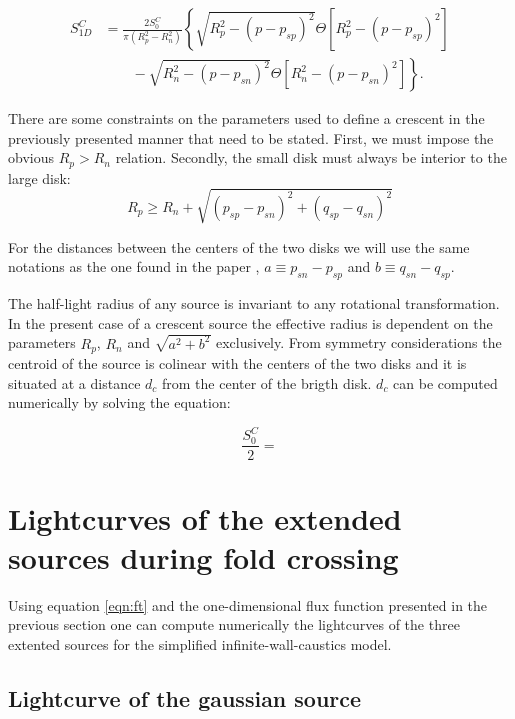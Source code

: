 \begin{align}
 S_{1D}^C &= \frac{2 S_0^C}{\pi \left(R_p^2-R_n^2 \right)} \left\{ \sqrt{R_p^2 - (p-p_{sp})^2}  \Theta \left[ R_p^2 - \left( p-p_{sp} \right)^2 \right] \right.\nonumber\\
 &\qquad \left. {} - \sqrt{R_n^2 - (p-p_{sn})^2 } \Theta \left[ R_n^2 - \left( p-p_{sn} \right)^2 \right] \right\}.
\end{align}


There are some constraints on the parameters used to define a crescent in the previously presented manner that need to be stated. First, we must impose the obvious $R_p > R_n$ relation. Secondly, 
the small disk must always be interior to the large disk:
\begin{equation}
 R_p \ge R_n + \sqrt{\left(p_{sp} - p_{sn} \right)^2 + \left(q_{sp} - q_{sn} \right)^2}
\end{equation}

For the distances between the centers of the two disks we will use the same notations as the one found in the paper \citep{2013MNRAS.434..765K}, $a \equiv p_{sn} - p_{sp}$ and $b \equiv q_{sn} - q_{sp}$.

The half-light radius of any source is invariant to any rotational transformation. In the present case of a crescent source the effective radius is dependent on the parameters $R_p$, $R_n$ and $\sqrt{a^2+b^2}$ exclusively. From symmetry considerations the centroid of the source is colinear with the centers of the two disks and it is situated at a distance $d_c$ from the center of the brigth disk. $d_c$ can be computed numerically by solving the equation:

\begin{equation}
\frac{S_0^C}{2} =  
\end{equation}   

\section{Lightcurves of the extended sources during fold crossing}

Using equation \ref{eqn:ft} and the one-dimensional flux function presented in the previous section one can compute numerically the lightcurves of the three extented sources for the simplified 
infinite-wall-caustics model.

\subsection{Lightcurve of the gaussian source}

